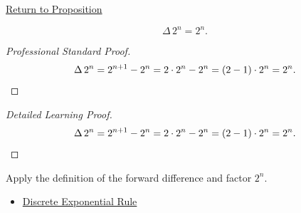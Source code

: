 \newpage
{}
\label{prf:delta-two-n}

\begin{remark*}[Return]
\hyperref[prop:delta-two-n]{Return to Proposition}
\end{remark*}

\begin{proposition*}[\(\Delta 2^n = 2^n\)]
\[
\Delta\, 2^n = 2^n.
\]
\end{proposition*}

\begin{proof}[Professional Standard Proof]
\LRAProofBodyStart
\[
\Delta\, 2^n = 2^{n+1} - 2^n = 2\cdot 2^n - 2^n = (2-1)\cdot 2^n = 2^n. \qedhere
\]
\end{proof}

\begin{proof}[Detailed Learning Proof]
\LRAProofBodyStart
\[
\Delta\, 2^n = 2^{n+1} - 2^n = 2\cdot 2^n - 2^n = (2-1)\cdot 2^n = 2^n. \qedhere
\]
\end{proof}

\begin{remark*}
Apply the definition of the forward difference and factor \(2^n\).
\end{remark*}

\begin{dependencies}
\begin{itemize}
  \item \hyperref[prop:discrete-exponential-rule]{Discrete Exponential Rule}
\end{itemize}
\end{dependencies}
\clearpage
